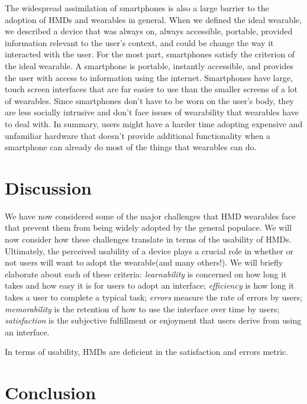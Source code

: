 \documentclass[11pt]{article}
\newcommand{\myreferences}{references}
\begin{document}
The widespread assimilation of smartphones is also a large barrier to the adoption of HMDs and wearables in general. When we defined the ideal wearable, we described a device that was always on, always accessible, portable, provided information relevant to the user's context, and could be change the way it interacted with the user. For the most part, smartphones satisfy the criterion of the ideal wearable\cite{fromCyborgsToGG}. A smartphone is portable, instantly accessible, and provides the user with access to information using the internet. Smartphones have large, touch screen interfaces that are far easier to use than the smaller screens of a lot of wearables. Since smartphones don't have to be worn on the user's body, they are less socially intrusive and don't face issues of wearability that wearables have to deal with. In summary, users might have a harder time adopting expensive and unfamiliar hardware that doesn't provide additional functionality when a smartphone can already do most of the things that wearables can do.  

\section{Discussion}

We have now considered some of the major challenges that HMD wearables face that prevent them from being widely adopted by the general populace. We will now consider how these challenges translate in terms of the usability of HMDs.  Ultimately, the perceived usability of a device plays a crucial role in whether or not users will want to adopt the wearable\cite{WearableHumanView}\cite{UserAcceptance}\cite{WhyUsersDont}\cite{hmdOlderAdults}(and many others!). We will briefly elaborate about each of these criteria: \textit{learnability} is concerned on how long it takes and how easy it is for users to adopt an interface; \textit{efficiency} is how long it takes a user to complete a typical task; \textit{errors} measure the rate of errors by users; \textit{memorability} is the retention of how to use the interface over time by users; \textit{satisfaction} is the subjective fulfillment or enjoyment that users derive from using an interface. 

In terms of usability, HMDs are deficient in the satisfaction and errors metric.  

\section{Conclusion}


\end{document}
